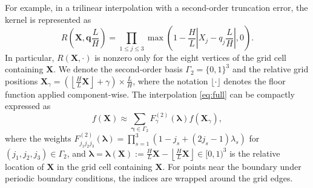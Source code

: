 \documentclass[review,onefignum,onetabnum]{siamart250211}
\begin{document}
For example, in a trilinear interpolation with a second-order truncation error, the kernel is represented as
\begin{equation}
R\left(\mathbf{X}, \mathbf{q}\frac{L}{H}\right) = \prod_{1\leq j \leq 3}\max\left(1-\frac{H}{L}\left|X_j - q_j \frac{L}{H}\right|,0\right).
\end{equation}
In particular, $R(\mathbf{X},\cdot)$ is nonzero only for the eight vertices of the grid cell containing $\mathbf{X}$. We denote the second-order basis \(\Gamma_2 = \{0,1\}^3\) and the relative grid positions \(\mathbf{X}_{{\gamma}} = \left( \left\lfloor \frac{H}{L} \mathbf{X} \right\rfloor + {\gamma} \right) \times \frac{L}{H}\), where the notation $\lfloor \cdot \rfloor$ denotes the floor function applied component-wise. The interpolation \eqref{eq:full} can be compactly expressed as
\begin{equation}
\label{eq:2ord}
f(\mathbf{X}) \approx \sum_{\boldsymbol{\gamma} \in \Gamma_2} F_{{\gamma}}^{(2)} (\boldsymbol{\lambda})f(\mathbf{X}_{{\gamma}}),
\end{equation}
where the weights \(F_{j_1 j_2 j_3}^{(2)}(\boldsymbol{\lambda}) = \prod_{s=1}^{3} \left( 1 - j_s + (2j_s - 1) \lambda_s \right)\) for \((j_1,j_2,j_3)\in \Gamma_2\), and $\boldsymbol{\lambda}=\boldsymbol{\lambda}(\mathbf{X}):=\frac{H}{L}\mathbf{X}-\left\lfloor \frac{H}{L} \mathbf{X} \right\rfloor \in [0,1)^3$ is the relative location of $\mathbf{X}$ in the grid cell containing $\mathbf{X}$. For points near the boundary under periodic boundary conditions, the indices are wrapped around the grid edges.
\end{document}
